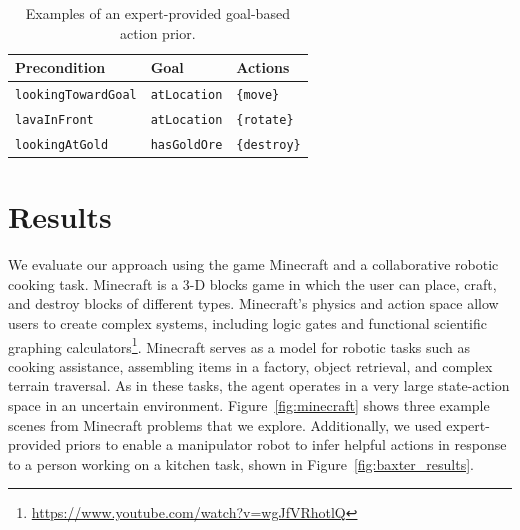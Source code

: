 \documentclass[letterpaper]{article}
\newcommand{\ra}[1]{\renewcommand{\arraystretch}{#1}} %
\begin{document}
\begin{table}[t]
\ra{1.15}
\small
\centering
\begin{tabular}{@{}lll}\toprule
Precondition & Goal & Actions \\ \midrule
\texttt{lookingTowardGoal} & \texttt{atLocation} & \texttt{\{move\}} \\
\texttt{lavaInFront} & \texttt{atLocation} & \texttt{\{rotate\}} \\
\texttt{lookingAtGold} & \texttt{hasGoldOre} & \texttt{\{destroy\}} \\
\bottomrule
\end{tabular}

\caption{Examples of an expert-provided goal-based action prior.\label{table:afford_kb_exp}}
\end{table}


\section{Results}
\label{sec:results}

We evaluate our approach using the game Minecraft and a collaborative
robotic cooking task.  Minecraft is a 3-D blocks game in which the
user can place, craft, and destroy blocks of different types.
Minecraft's physics and action space allow users to create complex
systems, including logic gates and functional scientific graphing
calculators\footnote{\url{https://www.youtube.com/watch?v=wgJfVRhotlQ}}.
Minecraft serves as a model for robotic tasks such as cooking
assistance, assembling items in a factory, object retrieval, and
complex terrain traversal.  As in these tasks, the agent operates in a
very large state-action space in an uncertain environment.
Figure~\ref{fig:minecraft} shows three example scenes from Minecraft
problems that we explore.  Additionally, we used expert-provided priors to
enable a manipulator robot to infer helpful actions in response to a
person working on a kitchen task, shown in Figure~\ref{fig:baxter_results}.
\end{document}
